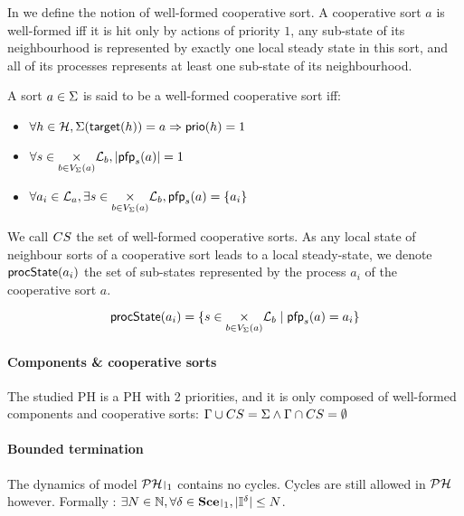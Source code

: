In  we define the notion of well-formed cooperative sort.
A cooperative sort $a$ is well-formed iff
it is hit only by actions of priority $1$,
any sub-state of its neighbourhood is represented by exactly one local steady state in this sort,
and all of its processes represents at least one sub-state of its neighbourhood.
\begin{definition}
\label{def:cs}
  A sort $a \in \Sigma$ is said to be a well-formed cooperative sort iff:
  \begin{itemize}
    \item $\forall h \in \mathcal{H}, \Sigma(\mathsf{target}(h)) = a \Rightarrow \mathsf{prio}(h) = 1$
    \item $\forall s \in \underset{b \in V_\Sigma(a)}{\times} \mathcal{L}_b, |\mathsf{pfp}_s(a)| = 1$
    \item $\forall a_i \in \mathcal{L}_a, \exists s \in \underset{b \in V_\Sigma(a)}{\times} \mathcal{L}_b, \mathsf{pfp}_s(a) = \{ a_i \}$
  \end{itemize}
\end{definition}
We call $CS$ the set of well-formed cooperative sorts.
As any local state of neighbour sorts of a cooperative sort leads to a local steady-state, we denote $\mathsf{procState}(a_i)$ the set of sub-states represented by the process $a_i$ of the cooperative sort $a$.
\begin{definition}[$\csState$]
\label{def:csState}
  $$\mathsf{procState}(a_i) = \{ s \in \underset{b \in V_\Sigma(a)}{\times} \mathcal{L}_b \mid \mathsf{pfp}_{s}(a) = a_i \}$$
\end{definition}

\paragraph{Components \& cooperative sorts}
The studied PH is a PH with 2 priorities, and it is only composed of well-formed components and cooperative sorts:
$\Gamma \cup CS = \Sigma \wedge \Gamma \cap CS = \emptyset$

\paragraph{Bounded termination}
The dynamics of model $\restriction{\PH}{1}$ contains no cycles. Cycles are still allowed in $\mathcal{PH}$ however.
Formally : $\exists N \in \sN, \forall \delta \in \restriction{\Sce}{1}, |\indexes{\delta}| \leq N$.



